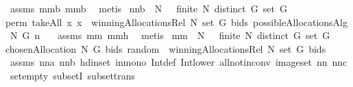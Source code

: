 \begin{isabellebody}
\ assms\ mm{}{}b\ mm{}{}b\ \isamarkupfalse%
\ metis%
\endisatagproof
{\isafoldproof}%
%
\isadelimproof
\isanewline
%
\endisadelimproof
\isanewline
{}\isamarkupfalse%
\ nn{}{}b{\isacharcolon}\ \ {\isachardoublequoteopen}N\ {\isasymnoteq}\ {\isacharbraceleft}{\isacharbraceright}{\isachardoublequoteclose}\ {\isachardoublequoteopen}finite\ N{\isachardoublequoteclose}\ {\isachardoublequoteopen}distinct\ G{\isachardoublequoteclose}\ {\isachardoublequoteopen}set\ G\ {\isasymnoteq}\ {\isacharbraceleft}{\isacharbraceright}{\isachardoublequoteclose}\ \ \isanewline
{\isachardoublequoteopen}perm{}\ {\isacharparenleft}takeAll\ {\isacharparenleft}{\isacharpercent}x{\isachardot}\ x\ {\isasymin}\ winningAllocationsRel\ N\ {\isacharparenleft}set\ G{\isacharparenright}\ bids{\isacharparenright}\ {\isacharparenleft}possibleAllocationsAlg{}\ N\ G{\isacharparenright}{\isacharparenright}\ n\ {\isasymnoteq}\ {\isacharbrackleft}{\isacharbrackright}{\isachardoublequoteclose}\isanewline
%
\isadelimproof
%
\endisadelimproof
%
\isatagproof
{}\isamarkupfalse%
\ assms\ mm{}{}\ mm{}{}h\ \isamarkupfalse%
\ metis%
\endisatagproof
{\isafoldproof}%
%
\isadelimproof
\isanewline
%
\endisadelimproof
{}\isamarkupfalse%
\ mm{}{}{\isacharcolon}\ \ {\isachardoublequoteopen}N\ {\isasymnoteq}\ {\isacharbraceleft}{\isacharbraceright}{\isachardoublequoteclose}\ {\isachardoublequoteopen}finite\ N{\isachardoublequoteclose}\ {\isachardoublequoteopen}distinct\ G{\isachardoublequoteclose}\ {\isachardoublequoteopen}set\ G\ {\isasymnoteq}\ {\isacharbraceleft}{\isacharbraceright}{\isachardoublequoteclose}\ \ \isanewline
{\isachardoublequoteopen}chosenAllocation{\isacharprime}\ N\ G\ bids\ random\ {\isasymin}\ winningAllocationsRel\ N\ {\isacharparenleft}set\ G{\isacharparenright}\ bids{\isachardoublequoteclose}\isanewline
%
\isadelimproof
%
\endisadelimproof
%
\isatagproof
{}\isamarkupfalse%
\ assms\ nn{}{}a\ nn{}{}b\ hd{\isacharunderscore}in{\isacharunderscore}set\ in{\isacharunderscore}mono\ Int{\isacharunderscore}def\ Int{\isacharunderscore}lower{}\ all{\isacharunderscore}not{\isacharunderscore}in{\isacharunderscore}conv\ image{\isacharunderscore}set\ nn{}{}\ nn{}{}c\ set{\isacharunderscore}empty\ subsetI\ subset{\isacharunderscore}trans\isanewline

\end{isabellebody}
